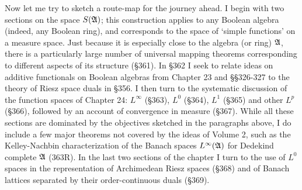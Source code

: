 Now let me try to sketch a route-map for the journey ahead.   I begin
with two sections on the space $S(\frak A)$;  this construction applies
to any Boolean algebra (indeed, any Boolean ring), and corresponds to
the space of `simple functions' on a measure space.   Just because it
is especially close to the algebra (or ring) $\frak A$, there is a
particularly large number of universal mapping theorems corresponding to
different aspects of its structure (\S361).   In \S362 I seek to relate
ideas on additive functionals on Boolean algebras from Chapter 23 and
\S\S326-327 to the theory of Riesz space duals in \S356.   I then
turn to the systematic discussion of the function spaces of Chapter 24:
$L^{\infty}$ (\S363), $L^0$ (\S364), $L^1$ (\S365) and other $L^p$
(\S366), followed by an account of convergence in measure (\S367).
While all these sections are dominated by the objectives sketched in the
paragraphs above, I do include a few major theorems not covered by the
ideas of Volume 2, such as the Kelley-Nachbin characterization of the
Banach spaces $L^{\infty}(\frak A)$ for Dedekind complete $\frak A$
(363R).   In the last two sections of the chapter I turn to
the use of $L^0$ spaces in the representation of Archimedean Riesz
spaces (\S368) and of Banach lattices separated by their
order-continuous duals (\S369).

\discrpage


